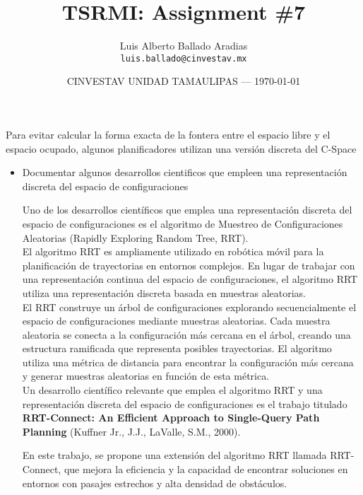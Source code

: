 \documentclass{article}
\title{TSRMI: Assignment \#7} %
\author{Luis Alberto Ballado Aradias\\ \texttt{luis.ballado@cinvestav.mx}} %
\date{CINVESTAV UNIDAD TAMAULIPAS --- \today} %
\begin{document}
\maketitle %


Para evitar calcular la forma exacta de la fontera entre el espacio libre y el espacio ocupado, algunos planificadores utilizan una versión discreta del C-Space 
\begin{itemize} %
\item {Documentar algunos desarrollos cientificos que empleen una representación discreta del espacio de configuraciones}

  Uno de los desarrollos científicos que emplea una representación discreta del espacio de configuraciones es el algoritmo de Muestreo de Configuraciones Aleatorias (Rapidly Exploring Random Tree, RRT).\\

  El algoritmo RRT es ampliamente utilizado en robótica móvil para la planificación de trayectorias en entornos complejos. En lugar de trabajar con una representación continua del espacio de configuraciones, el algoritmo RRT utiliza una representación discreta basada en muestras aleatorias.\\

  El RRT construye un árbol de configuraciones explorando secuencialmente el espacio de configuraciones mediante muestras aleatorias. Cada muestra aleatoria se conecta a la configuración más cercana en el árbol, creando una estructura ramificada que representa posibles trayectorias. El algoritmo utiliza una métrica de distancia para encontrar la configuración más cercana y generar muestras aleatorias en función de esta métrica.\\

  Un desarrollo científico relevante que emplea el algoritmo RRT y una representación discreta del espacio de configuraciones es el trabajo titulado \textbf{RRT-Connect: An Efficient Approach to Single-Query Path Planning} (Kuffner Jr., J.J., LaValle, S.M., 2000).
  
  En este trabajo, se propone una extensión del algoritmo RRT llamada RRT-Connect, que mejora la eficiencia y la capacidad de encontrar soluciones en entornos con pasajes estrechos y alta densidad de obstáculos.\\


\end{itemize}
\end{document}
